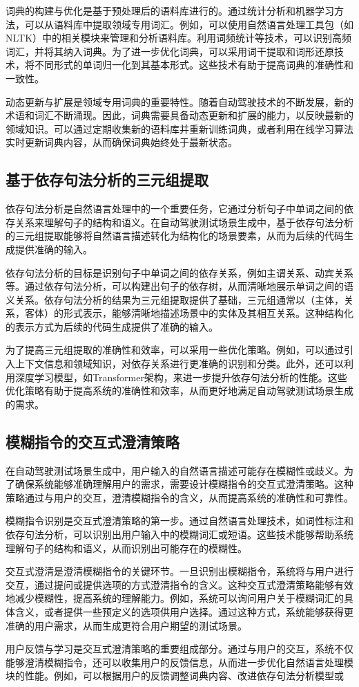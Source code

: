 词典的构建与优化是基于预处理后的语料库进行的。通过统计分析和机器学习方法，可以从语料库中提取领域专用词汇。例如，可以使用自然语言处理工具包（如NLTK）中的相关模块来管理和分析语料库。利用词频统计等技术，可以识别高频词汇，并将其纳入词典。为了进一步优化词典，可以采用词干提取和词形还原技术，将不同形式的单词归一化到其基本形式。这些技术有助于提高词典的准确性和一致性。

动态更新与扩展是领域专用词典的重要特性。随着自动驾驶技术的不断发展，新的术语和词汇不断涌现。因此，词典需要具备动态更新和扩展的能力，以反映最新的领域知识。可以通过定期收集新的语料库并重新训练词典，或者利用在线学习算法实时更新词典内容，从而确保词典始终处于最新状态。

\subsection{基于依存句法分析的三元组提取}
依存句法分析是自然语言处理中的一个重要任务，它通过分析句子中单词之间的依存关系来理解句子的结构和语义。在自动驾驶测试场景生成中，基于依存句法分析的三元组提取能够将自然语言描述转化为结构化的场景要素，从而为后续的代码生成提供准确的输入。

依存句法分析的目标是识别句子中单词之间的依存关系，例如主谓关系、动宾关系等。通过依存句法分析，可以构建出句子的依存树，从而清晰地展示单词之间的语义关系。依存句法分析的结果为三元组提取提供了基础，三元组通常以（主体，关系，客体）的形式表示，能够清晰地描述场景中的实体及其相互关系。这种结构化的表示方式为后续的代码生成提供了准确的输入。

为了提高三元组提取的准确性和效率，可以采用一些优化策略。例如，可以通过引入上下文信息和领域知识，对依存关系进行更准确的识别和分类。此外，还可以利用深度学习模型，如Transformer架构，来进一步提升依存句法分析的性能。这些优化策略有助于提高系统的准确性和效率，从而更好地满足自动驾驶测试场景生成的需求。

\subsection{模糊指令的交互式澄清策略}
在自动驾驶测试场景生成中，用户输入的自然语言描述可能存在模糊性或歧义。为了确保系统能够准确理解用户的需求，需要设计模糊指令的交互式澄清策略。这种策略通过与用户的交互，澄清模糊指令的含义，从而提高系统的准确性和可靠性。

模糊指令识别是交互式澄清策略的第一步。通过自然语言处理技术，如词性标注和依存句法分析，可以识别出用户输入中的模糊词汇或短语。这些技术能够帮助系统理解句子的结构和语义，从而识别出可能存在的模糊性。

交互式澄清是澄清模糊指令的关键环节。一旦识别出模糊指令，系统将与用户进行交互，通过提问或提供选项的方式澄清指令的含义。这种交互式澄清策略能够有效地减少模糊性，提高系统的理解能力。例如，系统可以询问用户关于模糊词汇的具体含义，或者提供一些预定义的选项供用户选择。通过这种方式，系统能够获得更准确的用户需求，从而生成更符合用户期望的测试场景。

用户反馈与学习是交互式澄清策略的重要组成部分。通过与用户的交互，系统不仅能够澄清模糊指令，还可以收集用户的反馈信息，从而进一步优化自然语言处理模块的性能。例如，可以根据用户的反馈调整词典内容、改进依存句法分析模型或